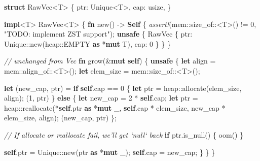 \documentclass[a4paper,]{book}
\newenvironment{Shaded}{\begin{snugshade}}{\end{snugshade}}
\newcommand{\KeywordTok}[1]{\textcolor[rgb]{0.13,0.29,0.53}{\textbf{{#1}}}}
\newcommand{\DataTypeTok}[1]{\textcolor[rgb]{0.13,0.29,0.53}{{#1}}}
\newcommand{\DecValTok}[1]{\textcolor[rgb]{0.00,0.00,0.81}{{#1}}}
\newcommand{\StringTok}[1]{\textcolor[rgb]{0.31,0.60,0.02}{{#1}}}
\newcommand{\CommentTok}[1]{\textcolor[rgb]{0.56,0.35,0.01}{\textit{{#1}}}}
\newcommand{\PreprocessorTok}[1]{\textcolor[rgb]{0.56,0.35,0.01}{\textit{{#1}}}}
\newcommand{\NormalTok}[1]{{#1}}
\begin{document}
\begin{Shaded}
\begin{Highlighting}[]
\KeywordTok{struct} \NormalTok{RawVec<T> \{}
    \NormalTok{ptr: Unique<T>,}
    \NormalTok{cap: }\DataTypeTok{usize}\NormalTok{,}
\NormalTok{\}}

\KeywordTok{impl}\NormalTok{<T> RawVec<T> \{}
    \KeywordTok{fn} \NormalTok{new() -> }\KeywordTok{Self} \NormalTok{\{}
        \PreprocessorTok{assert!}\NormalTok{(mem::size_of::<T>() != }\DecValTok{0}\NormalTok{, }\StringTok{"TODO: implement ZST support"}\NormalTok{);}
        \KeywordTok{unsafe} \NormalTok{\{}
            \NormalTok{RawVec \{ ptr: Unique::new(heap::EMPTY }\KeywordTok{as} \NormalTok{*}\KeywordTok{mut} \NormalTok{T), cap: }\DecValTok{0} \NormalTok{\}}
        \NormalTok{\}}
    \NormalTok{\}}

    \CommentTok{// unchanged from Vec}
    \KeywordTok{fn} \NormalTok{grow(&}\KeywordTok{mut} \KeywordTok{self}\NormalTok{) \{}
        \KeywordTok{unsafe} \NormalTok{\{}
            \KeywordTok{let} \NormalTok{align = mem::align_of::<T>();}
            \KeywordTok{let} \NormalTok{elem_size = mem::size_of::<T>();}

            \KeywordTok{let} \NormalTok{(new_cap, ptr) = }\KeywordTok{if} \KeywordTok{self}\NormalTok{.cap == }\DecValTok{0} \NormalTok{\{}
                \KeywordTok{let} \NormalTok{ptr = heap::allocate(elem_size, align);}
                \NormalTok{(}\DecValTok{1}\NormalTok{, ptr)}
            \NormalTok{\} }\KeywordTok{else} \NormalTok{\{}
                \KeywordTok{let} \NormalTok{new_cap = }\DecValTok{2} \NormalTok{* }\KeywordTok{self}\NormalTok{.cap;}
                \KeywordTok{let} \NormalTok{ptr = heap::reallocate(*}\KeywordTok{self}\NormalTok{.ptr }\KeywordTok{as} \NormalTok{*}\KeywordTok{mut} \NormalTok{_,}
                                            \KeywordTok{self}\NormalTok{.cap * elem_size,}
                                            \NormalTok{new_cap * elem_size,}
                                            \NormalTok{align);}
                \NormalTok{(new_cap, ptr)}
            \NormalTok{\};}

            \CommentTok{// If allocate or reallocate fail, we'll get `null` back}
            \KeywordTok{if} \NormalTok{ptr.is_null() \{ oom() \}}

            \KeywordTok{self}\NormalTok{.ptr = Unique::new(ptr }\KeywordTok{as} \NormalTok{*}\KeywordTok{mut} \NormalTok{_);}
            \KeywordTok{self}\NormalTok{.cap = new_cap;}
        \NormalTok{\}}
    \NormalTok{\}}
\NormalTok{\}}



\end{Highlighting}
\end{Shaded}
\end{document}
